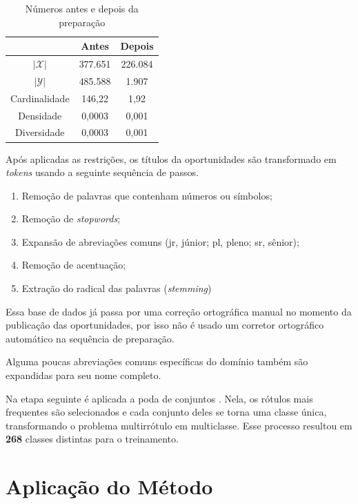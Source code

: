 \documentclass[runningheads,a4paper]{llncs}
\begin{document}
\begin{table}
	\centering
	\begin{tabular}{| c | c | c |}
		\hline
		& \textbf{Antes} & \textbf{Depois} \\
		\hline
		$|\mathcal{X}|$ & 377.651 & 226.084 \\
		\hline
		$|\mathcal{Y}|$ & 485.588 & 1.907 \\
		\hline
		Cardinalidade & 146,22 & 1,92 \\
		\hline
		Densidade & 0,0003 & 0,001 \\
		\hline
		Diversidade & 0,0003 & 0,001 \\
		\hline
	\end{tabular}
	\caption{Números antes e depois da preparação}
	\label{tab:preparacao}
\end{table}

Após aplicadas as restrições, os títulos da oportunidades são transformado em \textit{tokens} usando a seguinte sequência de passos.

\begin{enumerate}
	\item Remoção de palavras que contenham números ou símbolos;
	\item Remoção de \textit{stopwords};
	\item Expansão de abreviações comuns (jr, júnior; pl, pleno; sr, sênior);
	\item Remoção de acentuação;
	\item Extração do radical das palavras (\textit{stemming})
\end{enumerate}

Essa base de dados já passa por uma correção ortográfica manual no momento da publicação das oportunidades, por isso não é usado um corretor ortográfico automático na sequência de preparação.

Alguma poucas abreviações comuns específicas do domínio também são expandidas para seu nome completo.

Na etapa seguinte é aplicada a poda de conjuntos \cite{Read2008-bt}. Nela, os rótulos mais frequentes são selecionados e cada conjunto deles se torna uma classe única, transformando o problema multirrótulo em multiclasse. Esse processo resultou em \textbf{268} classes distintas para o treinamento.

\section{Aplicação do Método} \label{sec:aplicacao}
\end{document}
